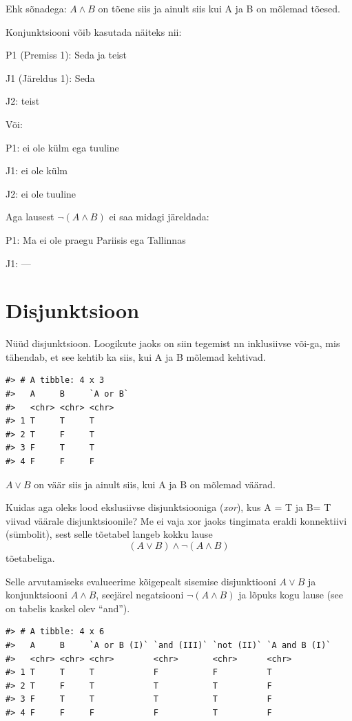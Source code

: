 \documentclass[]{book}
\begin{document}
Ehk sõnadega: \(A \land B\) on tõene siis ja ainult siis kui A ja B on
mõlemad tõesed.

Konjunktsiooni võib kasutada näiteks nii:

P1 (Premiss 1): Seda ja teist

J1 (Järeldus 1): Seda

J2: teist

Või:

P1: ei ole külm ega tuuline

J1: ei ole külm

J2: ei ole tuuline

Aga lausest \(\neg (A \land B)\) ei saa midagi järeldada:

P1: Ma ei ole praegu Pariisis ega Tallinnas

J1: ---

\section{Disjunktsioon}\label{disjunktsioon}

Nüüd disjunktsioon. Loogikute jaoks on siin tegemist nn inklusiivse
või-ga, mis tähendab, et see kehtib ka siis, kui A ja B mõlemad
kehtivad.

\begin{verbatim}
#> # A tibble: 4 x 3
#>   A     B     `A or B`
#>   <chr> <chr> <chr>   
#> 1 T     T     T       
#> 2 T     F     T       
#> 3 F     T     T       
#> 4 F     F     F
\end{verbatim}

\(A \lor B\) on väär siis ja ainult siis, kui A ja B on mõlemad väärad.

Kuidas aga oleks lood ekslusiivse disjunktsiooniga (\emph{xor}), kus A =
T ja B= T viivad väärale disjunktsioonile? Me ei vaja xor jaoks
tingimata eraldi konnektiivi (sümbolit), sest selle tõetabel langeb
kokku lause \[(A \lor B) \land \neg (A \land B)\] tõetabeliga.

Selle arvutamiseks evalueerime kõigepealt sisemise disjunktiooni
\(A \lor B\) ja konjunktsiooni \(A \land B\), seejärel negatsiooni
\(\neg (A \land B)\) ja lõpuks kogu lause (see on tabelis kaskel olev
``and'').

\begin{verbatim}
#> # A tibble: 4 x 6
#>   A     B     `A or B (I)` `and (III)` `not (II)` `A and B (I)`
#>   <chr> <chr> <chr>        <chr>       <chr>      <chr>        
#> 1 T     T     T            F           F          T            
#> 2 T     F     T            T           T          F            
#> 3 F     T     T            T           T          F            
#> 4 F     F     F            F           T          F
\end{verbatim}
\end{document}
